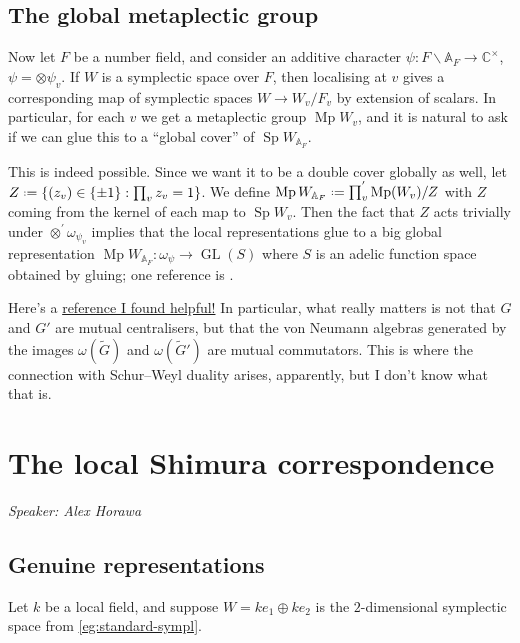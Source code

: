 \documentclass[11pt,a4paper,leqno]{article}
\newcommand{\A}{\mathbb{A}}
\newcommand{\1}{\mathbbm{1}}
\newcommand{\C}{\mathbb{C}}
\newcommand*{\defeq}{\mathrel{\vcenter{\baselineskip0.5ex \lineskiplimit0pt
      \hbox{\scriptsize.}\hbox{\scriptsize.}}}%
  =}
\renewcommand{\tilde}{\widetilde}
\DeclareMathOperator{\Sp}{Sp}
\DeclareMathOperator{\Mp}{Mp}
\DeclareMathOperator{\GL}{GL}
\theoremstyle{plain}
\theoremstyle{definition}
\theoremstyle{remark}
\numberwithin{equation}{section}
\begin{document}
\subsection{The global metaplectic group}
\label{sec:glob-metapl-group}

Now let $F$ be a number field, and consider an additive character
$\psi \colon F \backslash \A_{F} \to \C^{\times}$, $\psi = \otimes \psi_{v}$. If $W$ is a symplectic
space over $F$, then localising at $v$ gives a corresponding map of
symplectic spaces $W \to W_{v}/F_{v}$ by extension of scalars. In
particular, for each $v$ we get a metaplectic group $\Mp W_{v}$, and
it is natural to ask if we can glue this to a ``global cover'' of $\Sp
W_{\A_{F}}$.

This is indeed possible. Since we want it to be a double cover
globally as well, let
$Z \defeq \{ (z_{v}) \in \{\pm 1\} : \prod_{v} z_{v} = 1\}$. We define
$\Mp W_{\A_{F}} \defeq \prod_{v}^{'}\Mp(W_{v}) / Z$ with $Z$ coming from
the kernel of each map to $\Sp W_{v}$. Then the
fact that $Z$ acts trivially under $\otimes^{'} \omega_{\psi_{v}}$ implies that the
local representations glue to a big global representation $\Mp
W_{\A_{F}} \colon \omega_{\psi} \to \GL(S)$ where $S$ is an adelic function
space obtained by gluing; one reference is \cite[\S 29]{weil1964}.

Here's a
\href{https://repository.kulib.kyoto-u.ac.jp/dspace/bitstream/2433/101923/1/0727-02.pdf}{reference I found helpful!} In particular, what really matters is not that $G$
and $G'$ are mutual centralisers, but that the von Neumann algebras
generated by the images $\omega (\tilde G)$ and $\omega (\tilde G')$ are mutual
commutators. This is where the connection with Schur--Weyl duality
arises, apparently, but I don't know what that is.


\section{The local Shimura correspondence}
\label{sec:local-shim-corr}
\emph{Speaker: Alex Horawa}

\subsection{Genuine representations}
\label{sec:genu-repr}

Let $k$ be a local field, and suppose $W = ke_{1}\oplus ke_{2}$ is the $2$-dimensional
symplectic space from \cref{eg:standard-sympl}.
\end{document}
